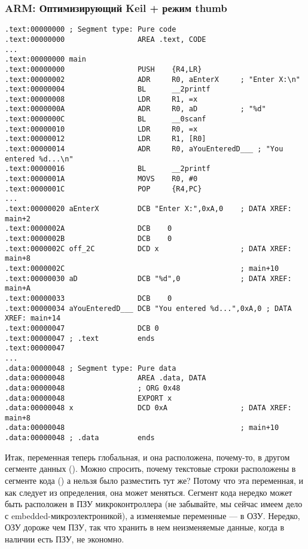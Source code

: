 ﻿%
\subsubsection{ARM: Оптимизирующий Keil + режим thumb}

\begin{lstlisting}
.text:00000000 ; Segment type: Pure code
.text:00000000                 AREA .text, CODE
...
.text:00000000 main
.text:00000000                 PUSH    {R4,LR}
.text:00000002                 ADR     R0, aEnterX     ; "Enter X:\n"
.text:00000004                 BL      __2printf
.text:00000008                 LDR     R1, =x
.text:0000000A                 ADR     R0, aD          ; "%d"
.text:0000000C                 BL      __0scanf
.text:00000010                 LDR     R0, =x
.text:00000012                 LDR     R1, [R0]
.text:00000014                 ADR     R0, aYouEnteredD___ ; "You entered %d...\n"
.text:00000016                 BL      __2printf
.text:0000001A                 MOVS    R0, #0
.text:0000001C                 POP     {R4,PC}
...
.text:00000020 aEnterX         DCB "Enter X:",0xA,0    ; DATA XREF: main+2
.text:0000002A                 DCB    0
.text:0000002B                 DCB    0
.text:0000002C off_2C          DCD x                   ; DATA XREF: main+8
.text:0000002C                                         ; main+10
.text:00000030 aD              DCB "%d",0              ; DATA XREF: main+A
.text:00000033                 DCB    0
.text:00000034 aYouEnteredD___ DCB "You entered %d...",0xA,0 ; DATA XREF: main+14
.text:00000047                 DCB 0
.text:00000047 ; .text         ends
.text:00000047
...
.data:00000048 ; Segment type: Pure data
.data:00000048                 AREA .data, DATA
.data:00000048                 ; ORG 0x48
.data:00000048                 EXPORT x
.data:00000048 x               DCD 0xA                 ; DATA XREF: main+8
.data:00000048                                         ; main+10
.data:00000048 ; .data         ends
\end{lstlisting}

Итак, переменная  теперь глобальная, и она расположена, почему-то, в другом сегменте данных (). 
Можно спросить, почему текстовые строки расположены в сегменте кода () а  нельзя было разместить
тут же? Потому что эта переменная, и как следует из определения, она может меняться. Сегмент кода нередко может 
быть расположен в ПЗУ микроконтроллера (не забывайте, мы сейчас имеем дело с embedded-микроэлектроникой),
а изменяемые переменные --- в ОЗУ.
Нередко, ОЗУ дороже чем ПЗУ, так что хранить в нем неизменяемые данные, когда в наличии есть ПЗУ, не экономно.

